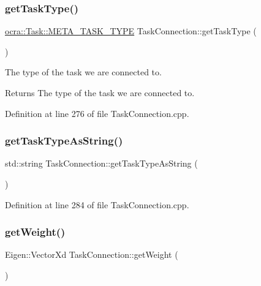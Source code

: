 \subsubsection{\texorpdfstring{get\+Task\+Type()}{getTaskType()}}
{\footnotesize\ttfamily \hyperlink{classocra_1_1Task_a8ddf2840d178ca273e886c9ca95248fe}{ocra\+::\+Task\+::\+M\+E\+T\+A\+\_\+\+T\+A\+S\+K\+\_\+\+T\+Y\+PE} Task\+Connection\+::get\+Task\+Type (\begin{DoxyParamCaption}{ }\end{DoxyParamCaption})}

The type of the task we are connected to.

\begin{DoxyReturn}{Returns}
The type of the task we are connected to. 
\end{DoxyReturn}


Definition at line 276 of file Task\+Connection.\+cpp.

\hypertarget{classocra__recipes_1_1TaskConnection_aab1504531e1371df092a8c589b100e1c}{}\label{classocra__recipes_1_1TaskConnection_aab1504531e1371df092a8c589b100e1c} 
\subsubsection{\texorpdfstring{get\+Task\+Type\+As\+String()}{getTaskTypeAsString()}}
{\footnotesize\ttfamily std\+::string Task\+Connection\+::get\+Task\+Type\+As\+String (\begin{DoxyParamCaption}{ }\end{DoxyParamCaption})}



Definition at line 284 of file Task\+Connection.\+cpp.

\hypertarget{classocra__recipes_1_1TaskConnection_a44930029ade716c0ebbe04fba658cf7e}{}\label{classocra__recipes_1_1TaskConnection_a44930029ade716c0ebbe04fba658cf7e} 
\subsubsection{\texorpdfstring{get\+Weight()}{getWeight()}}
{\footnotesize\ttfamily Eigen\+::\+Vector\+Xd Task\+Connection\+::get\+Weight (\begin{DoxyParamCaption}{ }\end{DoxyParamCaption})}


